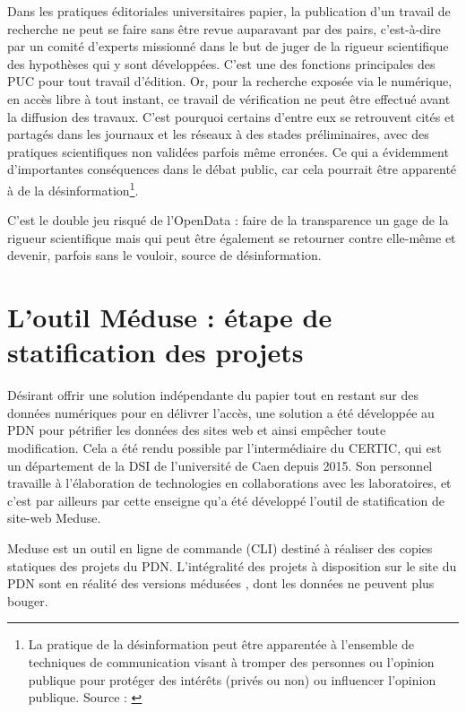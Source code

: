 \documentclass[a4paper,12pt,twoside]{book}
\begin{document}
Dans les pratiques éditoriales universitaires papier, la publication d'un travail de recherche ne peut se faire sans être revue auparavant par des pairs, c'est-à-dire par un comité d'experts missionné dans le but de juger de la rigueur scientifique des hypothèses qui y sont développées. C'est une des fonctions principales des \acrshort{PUC} pour tout travail d'édition. Or, pour la recherche exposée via le numérique, en accès libre à tout instant, ce travail de vérification ne peut être effectué avant la diffusion des travaux. C'est pourquoi certains d'entre eux se retrouvent cités et partagés dans les journaux et les réseaux à des stades préliminaires, avec des pratiques scientifiques non validées parfois même erronées. Ce qui a évidemment d'importantes conséquences dans le débat public, car cela pourrait être apparenté à de la désinformation\footnote{La pratique de la désinformation peut être apparentée à l'ensemble de techniques de communication visant à tromper des personnes ou l'opinion publique pour protéger des intérêts (privés ou non) ou influencer l'opinion publique. Source : \cite{desinformation}}.

C'est le double jeu risqué de l'OpenData : faire de la transparence un gage de la rigueur scientifique mais qui peut être également se retourner contre elle-même et devenir, parfois sans le vouloir, source de désinformation.
     
    
 \section{L'outil Méduse : étape de statification des projets}
    
 Désirant offrir une solution indépendante du papier tout en restant sur des données numériques pour en délivrer l'accès, une solution a été développée au \acrshort{PDN} pour \og pétrifier \fg les données des sites web et ainsi empêcher toute modification. Cela a été rendu possible par l'intermédiaire du \acrfull{CERTIC}, qui est un département de la \acrfull{DSI} de l'université de Caen depuis 2015. Son personnel travaille à l'élaboration de technologies en collaborations avec les laboratoires, et c'est par ailleurs par cette enseigne qu'a été développé l'outil de statification de site-web Meduse.
    
    
Meduse est un outil en ligne de commande (\acrshort{CLI}) destiné à réaliser des copies statiques des projets du \acrshort{PDN}. L'intégralité des projets à disposition sur le site du \acrshort{PDN} sont en réalité des versions \og médusées \fg, dont les données ne peuvent plus bouger.
\end{document}

